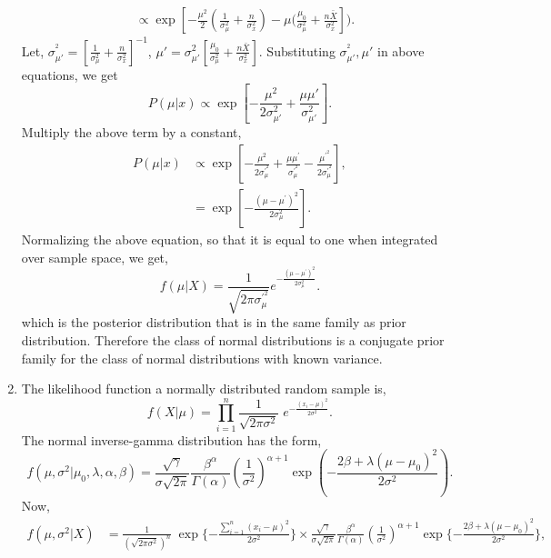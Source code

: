 \documentclass[a4paper,english,12pt]{article}
\begin{document}
\begin{enumerate}[label=(\alph*).]
\begin{align*}
&\propto \exp\left[-\frac{\mu^{2}}{2}(\frac{1}{\sigma_{\mu}^{2}}+\frac{n}{\sigma_{x}^{2}}) - \mu(\frac{\mu_{0}}{\sigma_{\mu}^{2}}+\frac{n\bar X}{\sigma_{x}^{2}}\right]).
\end{align*}
Let, $\sigma_{\mu'}^{^{2}} = [\frac{1}{\sigma_{\mu}^{2}}+\frac{n}{\sigma_{x}^{2}}]^{-1}$, $\mu' = \sigma_{\mu'}^{2}[\frac{\mu_{0}}{\sigma_{\mu}^{2}}+\frac{n\bar X}{\sigma_{x}^{2}}]$. Substituting $\sigma_{\mu'}^{^{2}}, \mu'$ in above equations, we get
\begin{equation*}
P(\mu | x)\propto \exp\left[-\frac{\mu^{2}}{2\sigma_{\mu'}^{2}}+\frac{\mu \mu'}{\sigma_{\mu'}^{2}}\right].
\end{equation*}
Multiply the above term by a constant,
\begin{align*}
P(\mu | x)&\propto \exp\left[-\frac{\mu^{2}}{2\sigma_{\mu}^{'^{2}}}+\frac{\mu \mu^{'}}{\sigma_{\mu}^{'^{2}}}-\frac{\mu^{'^{2}}}{2\sigma_{\mu}^{'^{2}}}\right],\\
&= \exp\left[-\frac{(\mu-\mu^{'})^{2}}{2\sigma_{\mu}^{2}}\right].
\end{align*}
Normalizing the above equation, so that it is equal to one when integrated over sample space, we get,
\begin{equation*}
f(\mu|X)= \frac{1}{\sqrt{2\pi \sigma_{\mu}^{'^{2}}}} e^{-\frac{(\mu-\mu^{'})^{2}}{2\sigma_{\mu}^{2}}}.
\end{equation*}
which is the posterior distribution that is in the same family as prior distribution. Therefore the class of normal distributions is a conjugate prior family for the class of normal distributions with known variance.
\item The likelihood function a normally distributed random sample is,
\begin{equation*}
f(X | \mu) = \prod_{i=1}^{n} \frac{1}{\sqrt{2\pi \sigma^{2}}} \;e^{-\frac{(x_{i}-\mu)^{2}}{2\sigma^{2}}}.
\end{equation*}
The normal inverse-gamma distribution has the form,
\begin{equation*}
f(\mu, \sigma^{2}| \mu_{0}, \lambda,\alpha,\beta) =  \frac{\sqrt{\gamma}}{\sigma\sqrt{2\pi}} \frac{\beta^{\alpha}}{\Gamma(\alpha)} (\frac{1}{\sigma^{2}})^{\alpha + 1} \exp(-\frac{2\beta + \lambda(\mu - \mu_{0})^{2}}{2\sigma^{2}}).
\end{equation*}
Now,
\begin{align*}
f(\mu, \sigma^{2}| X)&=\frac{1}{(\sqrt{2\pi \sigma^{2}})^{n}} \;\exp\{-\frac{\sum_{i=1}^{n}(x_{i}-\mu)^{2}}{2\sigma^{2}}\} \times \frac{\sqrt{\gamma}}{\sigma\sqrt{2\pi}} \frac{\beta^{\alpha}}{\Gamma(\alpha)} (\frac{1}{\sigma^{2}})^{\alpha + 1} \exp\{-\frac{2\beta + \lambda(\mu - \mu_{0})^{2}}{2\sigma^{2}}\},\\

\end{align*}
\end{enumerate}
\end{document}
